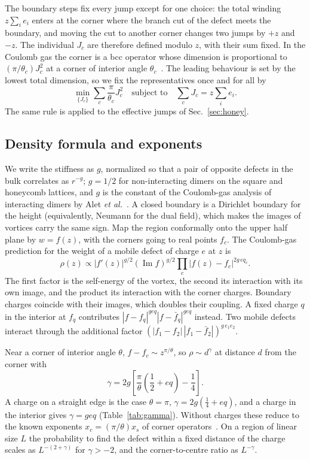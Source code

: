 \documentclass[aps,pre,twocolumn,superscriptaddress,nofootinbib,floatfix]{revtex4-2}
\begin{document}
The boundary steps fix every jump except for one choice: the total winding $z\sum_ie_i$ enters at the corner where the branch cut of the defect meets the boundary, and moving the cut to another corner changes two jumps by $+z$ and $-z$. The individual $J_c$ are therefore defined modulo $z$, with their sum fixed. In the Coulomb gas the corner is a bcc operator whose dimension is proportional to $(\pi/\theta_c)J_c^2$ at a corner of interior angle $\theta_c$~\cite{Allegra2015,Cardy1984}. The leading behaviour is set by the lowest total dimension, so we fix the representatives once and for all by
\begin{equation}
\min_{\{J_c\}}\sum_c\frac{\pi}{\theta_c}J_c^2\quad\text{subject to}\quad\sum_cJ_c=z\sum_ie_i .
\label{eq:rep}
\end{equation}
The same rule is applied to the effective jumps of Sec.~\ref{sec:honey}.

\subsection{Density formula and exponents}
We write the stiffness as $g$, normalized so that a pair of opposite defects in the bulk correlates as $r^{-g}$; $g=1/2$ for non-interacting dimers on the square and honeycomb lattices, and $g$ is the constant of the Coulomb-gas analysis of interacting dimers by Alet \emph{et al.}~\cite{Alet2005,Alet2006}. A closed boundary is a Dirichlet boundary for the height (equivalently, Neumann for the dual field), which makes the images of vortices carry the same sign. Map the region conformally onto the upper half plane by $w=f(z)$, with the corners going to real points $f_c$. The Coulomb-gas prediction for the weight of a mobile defect of charge $e$ at $z$ is
\begin{equation}
\rho(z)\propto|f'(z)|^{g/2}(\operatorname{Im}f)^{g/2}\prod_c|f(z)-f_c|^{2g\,eq_c}.
\label{eq:rho}
\end{equation}
The first factor is the self-energy of the vortex, the second its interaction with its own image, and the product its interaction with the corner charges. Boundary charges coincide with their images, which doubles their coupling. A fixed charge $q$ in the interior at $f_q$ contributes $|f-f_q|^{geq}|f-\bar f_q|^{geq}$ instead. Two mobile defects interact through the additional factor $(|f_1-f_2|\,|f_1-\bar f_2|)^{g\,e_1e_2}$.

Near a corner of interior angle $\theta$, $f-f_c\sim z^{\pi/\theta}$, so $\rho\sim d^{\gamma}$ at distance $d$ from the corner with
\begin{equation}
\gamma=2g\left[\frac{\pi}{\theta}\left(\frac12+eq\right)-\frac14\right].
\label{eq:gamma}
\end{equation}
A charge on a straight edge is the case $\theta=\pi$, $\gamma=2g(\tfrac14+eq)$, and a charge in the interior gives $\gamma=geq$ (Table~\ref{tab:gamma}). Without charges these reduce to the known exponents $x_c=(\pi/\theta)x_s$ of corner operators~\cite{Cardy1984}. On a region of linear size $L$ the probability to find the defect within a fixed distance of the charge scales as $L^{-(2+\gamma)}$ for $\gamma>-2$, and the corner-to-centre ratio as $L^{-\gamma}$.
\end{document}
